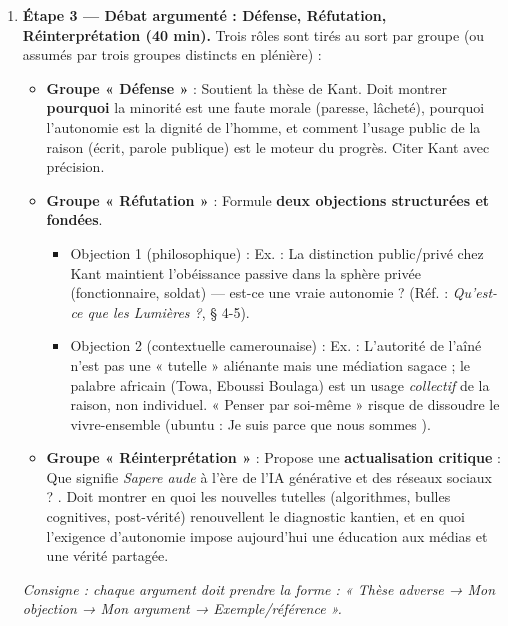 \documentclass[11pt]{article}
\newcommand{\cle}[1]{{\popxbold\color{popdark}#1}}
\begin{document}
\begin{enumerate}
    \item \textbf{Étape 3 — Débat argumenté : Défense, Réfutation, Réinterprétation (40 min).} Trois rôles sont tirés au sort par groupe (ou assumés par trois groupes distincts en plénière) :
    \begin{itemize}
        \item \textbf{Groupe « Défense »} : Soutient la thèse de Kant. Doit montrer \textbf{pourquoi} la minorité est une faute morale (paresse, lâcheté), pourquoi l'autonomie est la dignité de l'homme, et comment l'\cle{usage public de la raison} (écrit, parole publique) est le moteur du progrès. Citer Kant avec précision.
        \item \textbf{Groupe « Réfutation »} : Formule \textbf{deux objections structurées et fondées}.
        \begin{itemize}
            \item Objection 1 (philosophique) : Ex. : La distinction public/privé chez Kant maintient l'obéissance passive dans la sphère privée (fonctionnaire, soldat) — est-ce une vraie autonomie ? (Réf. : \emph{Qu'est-ce que les Lumières ?}, § 4-5).
            \item Objection 2 (contextuelle camerounaise) : Ex. : L'autorité de l'aîné n'est pas une « tutelle » aliénante mais une \cle{médiation sagace} ; le \cle{palabre} africain (Towa, Eboussi Boulaga) est un usage \emph{collectif} de la raison, non individuel. « Penser par soi-même » risque de dissoudre le \cle{vivre-ensemble} (ubuntu : \guillemotleft Je suis parce que nous sommes \guillemotright).
        \end{itemize}
        \item \textbf{Groupe « Réinterprétation »} : Propose une \textbf{actualisation critique} : \guillemotleft Que signifie \emph{Sapere aude} à l'ère de l'IA générative et des réseaux sociaux ? \guillemotright. Doit montrer en quoi les nouvelles tutelles (algorithmes, bulles cognitives, post-vérité) renouvellent le diagnostic kantien, et en quoi l'exigence d'autonomie impose aujourd'hui une \cle{éducation aux médias} et une \cle{vérité partagée}.
    \end{itemize}
    \textit{Consigne : chaque argument doit prendre la forme : « Thèse adverse → Mon objection → Mon argument → Exemple/référence ».}
    

\end{enumerate}
\end{document}
